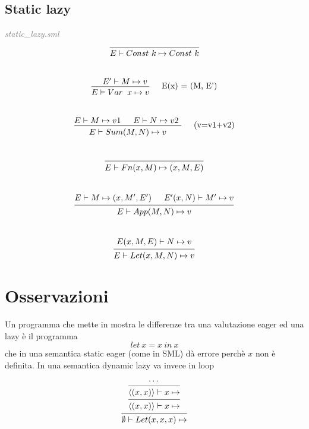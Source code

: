 \documentclass[a4paper]{article}
\begin{document}
	\subsection{Static lazy}
	\textit{\textcolor{gray}{static\_lazy.sml}} \\
	\[
		\begin{prooftree}
			\hypo{}
			\infer1[]{E \vdash Const \ k \mapsto Const \ k} 
		\end{prooftree}
	\]
	\\
	\[
		\begin{prooftree}
			\hypo{E' \vdash M \mapsto v }
			\infer1[\quad E(x) = (M, E')]{E \vdash Var &x \mapsto v}
		\end{prooftree}
	\]
	\\
	\[
		\begin{prooftree}
			\hypo{E \vdash M \mapsto v1}
			\hypo{E \vdash N \mapsto v2 }
			\infer2[\quad (v=v1+v2)]{E \vdash Sum(M, N) \mapsto v}
		\end{prooftree}
	\]
	\\
	\[
		\begin{prooftree}
			\hypo{}
			\infer1[]{E \vdash Fn(x, M) \mapsto (x, M, E)}
		\end{prooftree}
	\]
	\\
	\[
		\begin{prooftree}
			\hypo{E \vdash M \mapsto (x, M', E')}
			\hypo{E'(x, N) \vdash M' \mapsto v}
			\infer2[]{E \vdash App(M, N) \mapsto v}
		\end{prooftree}
	\]
	\\
	\[
		\begin{prooftree}
			\hypo{E(x, M, E) \vdash N \mapsto v}
			\infer1[]{E \vdash Let(x, M, N) \mapsto v}
		\end{prooftree}
	\]


	\section{Osservazioni}
	Un programma che mette in mostra le differenze tra una valutazione eager ed una lazy è il programma 
	\[ let \ x = x \ in \ x \]
	che in una semantica static eager (come in SML) dà errore perchè $x$ non è definita. In una semantica dynamic lazy va invece in loop

	\begin{figure}[ht]
	\[
		\begin{prooftree}
			\hypo{\cdots}
			\infer1[]{\langle (x,x) \rangle \vdash x \mapsto }
			\infer1[]{\langle (x,x) \rangle \vdash x \mapsto }
			\infer1[]{\emptyset \vdash Let(x,x,x) \mapsto }
		\end{prooftree}
	\]
	\end{figure}
\end{document}
